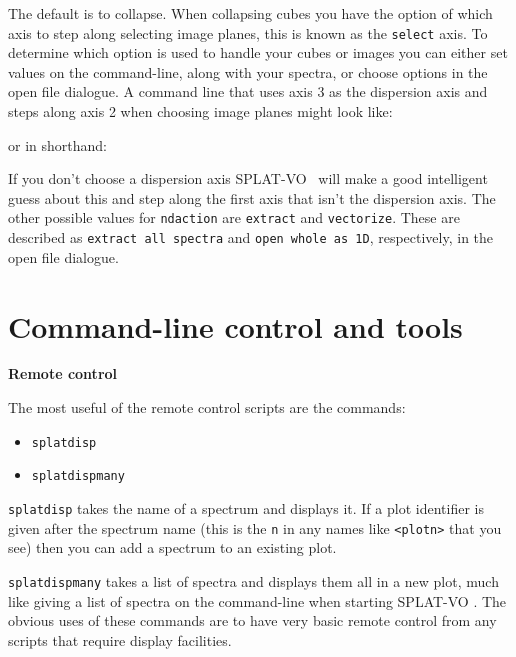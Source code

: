 \documentclass[twoside,11pt,nolof]{starlink}
\providecommand{\SPLAT}{\textsf{SPLAT-VO }}
\providecommand{\hitext}[1]{\texttt{#1}}
\providecommand{\subheading}[1]{\textbf{\large{#1}}}
\begin{document}
The default is to collapse. When collapsing cubes you have the option of which
axis to step along selecting image planes, this is known as the
\hitext{select} axis. To determine which option is used to handle your cubes or
images you can either set values on the command-line, along with your spectra,
or choose options in the open file dialogue. A command line that uses axis 3 as
the dispersion axis and steps along axis 2 when choosing image planes might
look like:
\begin{quote}
\begin{terminalv}
\end{terminalv}
\end{quote}
or in shorthand:
\begin{quote}
\begin{terminalv}
\end{terminalv}
\end{quote}
If you don't choose a dispersion axis \SPLAT\ will make a good intelligent
guess about this and step along the first axis that isn't the dispersion axis.
The other possible values for \hitext{ndaction} are \hitext{extract} and
\hitext{vectorize}. These are described as \hitext{extract all spectra}
and \hitext{open whole as 1D}, respectively, in the open file dialogue.

\section{Command-line control and tools}

\subheading{Remote control}

The most useful of the remote control scripts are the commands:
\begin{itemize}
 \item \hitext{splatdisp}
 \item \hitext{splatdispmany}
\end{itemize}
\hitext{splatdisp} takes the name of a spectrum and displays it.
If a plot identifier is given after the spectrum name (this is the
\hitext{n} in any names like \hitext{<plotn>} that you see) then you
can add a spectrum to an existing plot.

\hitext{splatdispmany} takes a list of spectra and displays them all in a
new plot, much like giving a list of spectra on the command-line when
starting \SPLAT. The obvious uses of these commands are to have very
basic remote control from any scripts that require display facilities.
\end{document}
